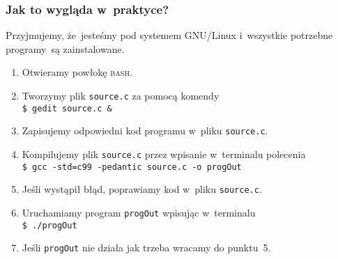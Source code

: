 \documentclass[10pt,t]{beamer}
\begin{document}
\begin{frame}
  \frametitle{Jak to wygląda w~praktyce?}


  Przyjmujemy, że~jesteśmy pod systemem GNU/Linux i~wszystkie potrzebne
  programy~są zainstalowane.




  \begin{enumerate}

  \item Otwieramy powłokę \textsc{bash}.



  \item Tworzymy plik \texttt{source.c} za pomocą komendy \\
    \texttt{\$ gedit source.c \&}



  \item Zapisujemy odpowiedni kod programu w~pliku \texttt{source.c}.



  \item Kompilujemy plik \texttt{source.c} przez wpisanie w~terminalu
    polecenia \\
    \texttt{\$ gcc -std=c99 -pedantic source.c -o progOut}



  \item Jeśli wystąpił błąd, poprawiamy kod w~pliku \texttt{source.c}.



  \item Uruchamiamy program \texttt{progOut} wpisując w~terminalu \\
    \texttt{\$ ./progOut}



  \item Jeśli \texttt{progOut} nie działa jak trzeba wracamy do punktu~5.

  \end{enumerate}

\end{frame}
\end{document}
